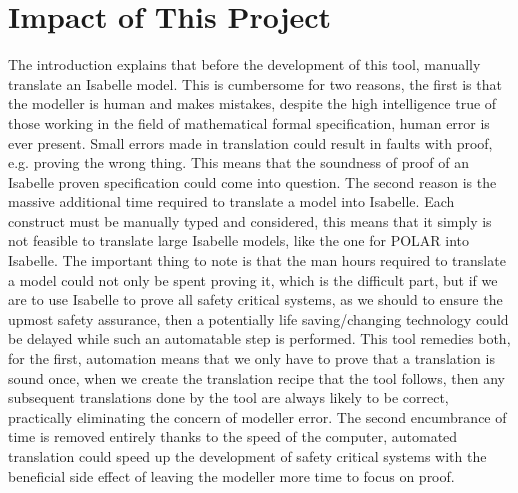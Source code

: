 \section{Impact of This Project}
The introduction explains that before the development of this tool, manually translate an Isabelle model. This is cumbersome for two reasons, the first is that the modeller is human and makes mistakes, despite the high intelligence true of those working in the field of mathematical formal specification, human error is ever present. Small errors made in translation could result in faults with proof, e.g. proving the wrong thing. This means that the soundness of proof of an Isabelle proven specification could come into question. The second reason is the massive additional time required to translate a model into Isabelle. Each construct must be manually typed and considered, this means that it simply is not feasible to translate large Isabelle models, like the one for POLAR into Isabelle. The important thing to note is that the man hours required to translate a model could not only be spent proving it, which is the difficult part, but if we are to use Isabelle to prove all safety critical systems, as we should to ensure the upmost safety assurance, then a potentially life saving/changing technology could be delayed while such an automatable step is performed. This tool remedies both, for the first, automation means that we only have to prove that a translation is sound once, when we create the translation recipe that the tool follows, then any subsequent translations done by the tool are always likely to be correct, practically eliminating the concern of modeller error. The second encumbrance of time is removed entirely thanks to the speed of the computer, automated translation could speed up the development of safety critical systems with the beneficial side effect of leaving the modeller more time to focus on proof.
